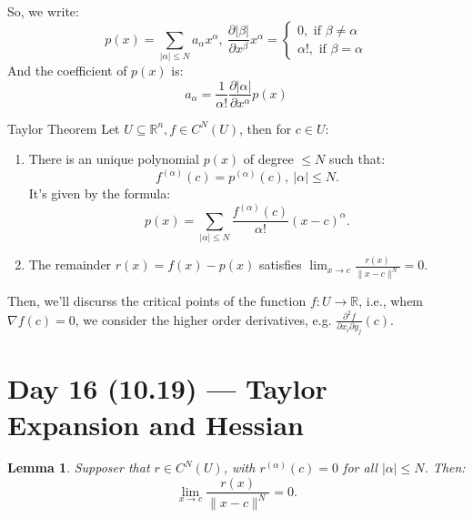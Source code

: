 \documentclass[11pt]{article}
\makeatletter
\newcounter{thmcounter}
\newenvironment{theorem}[1]{\begin{thmbox}{#1}{}}{\end{thmbox}}
\theoremstyle{quiet}
\newtheorem{lemma}[thmcounter]{Lemma}
\newtheorem{lemma}[tcb@cnt@defbox]{Lemma}
\theoremstyle{quietremark}
\makeatother
\begin{document}
So, we write:
\[
p(x)=\sum_{|\alpha|\le N}a_\alpha x^\alpha,~\frac{\partial |\beta|}{\partial x^\beta}x^\alpha=\begin{cases}0,\text{ if }\beta\ne\alpha\\\alpha!,\text{ if } \beta=\alpha\end{cases}
\]
And the coefficient of $p(x)$ is:
\[
a_\alpha=\frac{1}{\alpha!}\frac{\partial|\alpha|}{\partial x^\alpha}p(x)
\]

\begin{theorem}{Taylor Theorem}
Let $U\subseteq\mathbb{R}^n, f\in C^N(U)$, then for $c\in U$:
\begin{enumerate}
\item There is an unique polynomial $p(x)$ of degree $\le N$ such that:
\[
f^{(\alpha)}(c)=p^{(\alpha)}(c),~|\alpha|\le N.
\]
It's given by the formula:
\[
p(x)=\sum_{|\alpha|\le N}\frac{f^{(\alpha)}(c)}{\alpha!}(x-c)^\alpha.
\]
\item The remainder $r(x)=f(x)-p(x)$ satisfies $\lim_{x\to c}\frac{r(x)}{\|x-c\|^N}=0$.
\end{enumerate}
\end{theorem}

Then, we'll discurss the critical points of the function $f:U\to\mathbb{R}$, i.e., whem $\nabla f(c)=0$, we consider the higher order derivatives, e.g. $\frac{\partial^2 f}{\partial x_i\partial y_j}(c)$.

\newpage
\section{Day 16 (10.19) --- Taylor Expansion and Hessian}
\begin{lemma}{}
Supposer that $r\in C^N(U)$, with $r^{(\alpha)}(c)=0$ for all $|\alpha|\le N$. Then:
\[
\lim_{x\to c}\frac{r(x)}{\|x-c\|^N}=0.
\]
\end{lemma}
\end{document}
